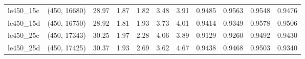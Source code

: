 \begin{tabular}{llrrrrrrrrr}
 le450\_15c & (450, 16680) & 28.97 & 1.87 & 1.82 &  3.48 &   3.91 &   0.9485 &   0.9563 &     0.9548 &      0.9476 \\
 le450\_15d & (450, 16750) & 28.92 & 1.81 & 1.93 &  3.73 &   4.01 &   0.9414 &   0.9349 &     0.9578 &      0.9506 \\
 le450\_25c & (450, 17343) & 30.25 & 1.97 & 2.28 &  4.06 &   3.89 &   0.9129 &   0.9260 &     0.9492 &      0.9430 \\
 le450\_25d & (450, 17425) & 30.37 & 1.93 & 2.69 &  3.62 &   4.67 &   0.9438 &   0.9468 &     0.9503 &      0.9340 \\
\bottomrule
\end{tabular}
